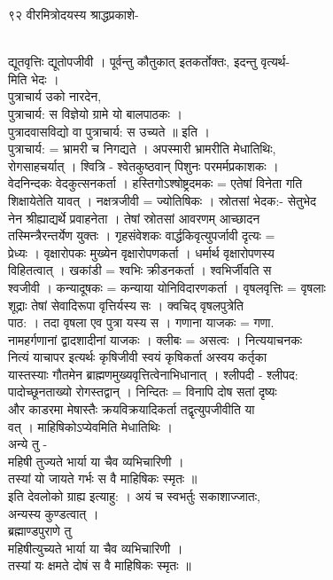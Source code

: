 \documentclass[11pt, openany]{book}
\begin{document}
{९२ }{ वीरमित्रोदयस्य श्राद्धप्रकाशे-}{\\
द्यूतवृत्तिः द्यूतोपजीवी । पूर्वन्तु कौतुकात् इतकर्तोक्तः, इदन्तु
वृत्यर्थ-\\
मिति भेदः ।\\
पुत्राचार्य उको नारदेन,\\
पुत्राचार्य: स विज्ञेयो ग्रामे यो बालपाठकः ।\\
पुत्रादवासविद्यो वा पुत्राचार्य: स उच्यते ॥ इति ।\\
पुत्राचार्य: = भ्रामरी च निगद्यते । अपस्मारी भ्रामरीति मेधातिथिः,\\
रोगसाहचर्यात् । श्वित्रि - श्वेतकुष्ठवान् \textbar{} पिशुनः
परमर्मप्रकाशकः ।\\
वेदनिन्दकः वेदकुत्सनकर्ता । हस्तिगोऽश्षोष्ट्रदमकः = एतेषां विनेता गति\\
शिक्षायेतेति यावत् । नक्षत्रजीवी = ज्योतिषिकः । स्रोतसां भेदक:-
सेतुभेद\\
नेन श्रीह्याद्यर्थे प्रवाहनेता । तेषां स्रोतसां आवरणम् आच्छादन\\
तस्मिन्त्रैरन्तर्येण युक्तः । गृहसंवेशकः वार्द्धकिवृत्युपर्जावी
\textbar{} दृत्यः =\\
प्रेध्यः । वृक्षारोपकः मुख्येन वृक्षारोपणकर्ता । धर्मार्थ
वृक्षारोपणस्य\\
विहितत्वात् । खकांडी = श्वभिः क्रीडनकर्ता । श्वभिर्जीवति स\\
श्वजीवी । कन्यादूषकः = कन्याया योनिविदारणकर्ता । वृषलवृत्तिः = वृषलाः\\
शूद्राः तेषां सेवादिरूपा वृत्तिर्यस्य सः । क्वचिद् वृषलपुत्रेति\\
पाठ: । तदा वृषला एव पुत्रा यस्य स । गणाना याजकः = गणा.\\
नामहर्गणानां द्वादशादीनां याजकः । क्लीबः = असत्वः । नित्ययाचनकः\\
नित्यं याचापर इत्यर्थः \textbar{} कृषिजीवी स्वयं कृषिकर्ता \textbar{}
अस्वय कर्तृका\\
यास्तस्याः गौतमेन ब्राह्मणमुख्यवृत्तित्वेनाभिधानात् । श्लीपदी -
श्लीपद:\\
पादोच्छूनताख्यो रोगस्तद्वान् । निन्दितः = विनापि दोष सतां दृष्यः\\
और काडरमा मेषास्तैः क्रयविक्रयादिकर्ता तद्वृत्युपजीवीति या\\
वत् । माहिषिकोऽप्येवमिति मेधातिथिः ।\\
अन्ये तु -\\
महिषी तुज्यते भार्या या चैव व्यभिचारिणी ।\\
तस्यां यो जायते गर्भः स वै माहिषिकः स्मृतः ॥\\
इति देवलोको ग्राह्य इत्याहु: । अयं च स्वभर्तुः सकाशाज्जातः,\\
अन्यस्य कुण्डत्वात् ।\\
ब्रह्माण्डपुराणे तु\\
महिषीत्युच्यते भार्या या चैव व्यभिचारिणी ।\\
तस्यां यः क्षमते दोषं स वै माहिषिकः स्मृतः ॥

}
\end{document}

